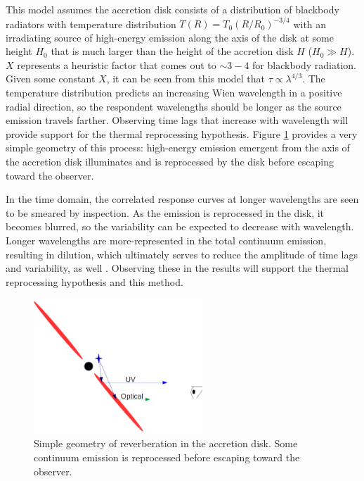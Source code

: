\documentclass[11pt,letterpaper]{article}
\begin{document}
    This model assumes the accretion disk consists of a distribution of blackbody radiators with temperature distribution $T\left(R\right) = T_0\left(R/R_0\right)^{-3/4}$ with an irradiating source of high-energy emission along the axis of the disk at some height $H_0$ that is much larger than the height of the accretion disk $H$ ($H_0 \gg H$). $X$ represents a heuristic factor that comes out to $\sim3-4$ for blackbody radiation. Given some constant $X$, it can be seen from this model that $\tau \propto \lambda^{4/3}$. The temperature distribution predicts an increasing Wien wavelength in a positive radial direction, so the respondent wavelengths should be longer as the source emission travels farther. Observing time lags that increase with wavelength will provide support for the thermal reprocessing hypothesis. Figure \ref{fig:disk_reverb} provides a very simple geometry of this process: high-energy emission emergent from the axis of the accretion disk illuminates and is reprocessed by the disk before escaping toward the observer.

    In the time domain, the correlated response curves at longer wavelengths are seen to be smeared by inspection. As the emission is reprocessed in the disk, it becomes blurred, so the variability can be expected to decrease with wavelength. Longer wavelengths are more-represented in the total continuum emission, resulting in dilution, which ultimately serves to reduce the amplitude of time lags and variability, as well \citep{2014A&ARv..22...72U}. Observing these in the results will support the thermal reprocessing hypothesis and this method.

    \begin{figure}
        \centering
        \includegraphics[width=2.5in]{../img/basic_geometry.png}
        \caption{Simple geometry of reverberation in the accretion disk. Some continuum emission is reprocessed before escaping toward the observer.}
        \label{fig:disk_reverb}
    \end{figure}
\end{document}
